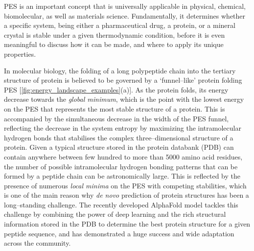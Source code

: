 
PES is an important concept that is universally applicable in physical, chemical, biomolecular, as well as materials science. Fundamentally, it determines whether a specific system, being either a pharmaceutical drug, a protein, or a mineral crystal is stable under a given thermodynamic condition, before it is even meaningful to discuss how it can be made, and where to apply its unique properties. 

In molecular biology, the folding of a long polypeptide chain into the tertiary structure of protein is believed to be governed by a `funnel--like' protein folding PES [\cref{fig:energy_landscape_examples}(a)].\cite{onuchic1995toward} As the protein folds, its energy decrease towards the \textit{global minimum}, which is the point with the lowest energy on the PES that represents the most stable structure of a protein. This is accompanied by the simultaneous decrease in the width of the PES funnel, reflecting the decrease in the system entropy by maximizing the intramolecular hydrogen bonds\cite{mu2005energy} that stabilises the complex three--dimensional structure of a protein. Given a typical structure stored in the protein databank  (PDB)\cite{berman2000protein} can contain anywhere between few hundred to more than 5000 amino acid residues,\cite{pdb2019protein} the number of possible intramolecular  hydrogen bonding patterns that can be formed by a peptide chain can be astronomically large. This is reflected by the presence of numerous \textit{local minima} on the PES with competing stabilities, which is one of the main reason why  \textit{de novo} prediction of protein structures has been a long--standing challenge.\cite{freddolino2010challenges} The recently developed AlphaFold\cite{jumper2021highly} model tackles this challenge by combining the power of deep learning and the rich structural information stored in the PDB to determine the best protein structure for a given peptide sequence, and has demonstrated a huge success and wide adaptation across the community.


